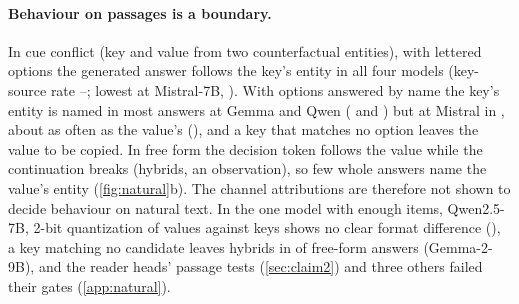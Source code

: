 \paragraph{Behaviour on passages is a boundary.}
In cue conflict (key and value from two counterfactual entities), with lettered options the generated answer follows the key's entity in all four models (key-source rate \JaKeySrcLetaMistralSeven--\JaKeySrcLetaGemmaNine; lowest at Mistral-7B, \ci{\JaKeySrcLetaMistralSeven}{\JaKeySrcLetaMistralSevenLo}{\JaKeySrcLetaMistralSevenHi}). With options answered by name the key's entity is named in most answers at Gemma and Qwen (\JaKeySrcOptaGemmaNine{} and \JaKeySrcOptaQwenSeven) but at Mistral in \ci{\JaKeySrcOptaMistralSeven}{\JaKeySrcOptaMistralSevenLo}{\JaKeySrcOptaMistralSevenHi}, about as often as the value's (\JaValSrcOptaMistralSeven), and a key that matches no option leaves the value to be copied. In free form the decision token follows the value while the continuation breaks (hybrids, an observation), so few whole answers name the value's entity (\cref{fig:natural}b). The channel attributions are therefore not shown to decide behaviour on natural text. In the one model with enough items, Qwen2.5-7B, 2-bit quantization of values against keys shows no clear format difference (\ci{$\JaSevenDiDQwenSeven$}{$\JaSevenDiDQwenSevenLo$}{\JaSevenDiDQwenSevenHi}), a key matching no candidate leaves hybrids in \ci{\JaEightdNomGemmaNine}{\JaEightdNomGemmaNineLo}{\JaEightdNomGemmaNineHi} of free-form answers (Gemma-2-9B), and the reader heads' passage tests (\cref{sec:claim2}) and three others failed their gates (\cref{app:natural}).
